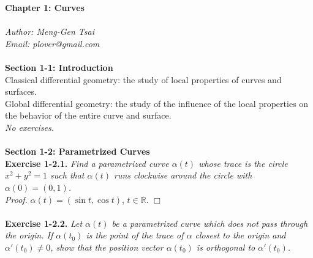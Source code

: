 \documentclass{article}
\begin{document}
\textbf{\Large Chapter 1: Curves} \\\\



\emph{Author: Meng-Gen Tsai} \\
\emph{Email: plover@gmail.com} \\\\









\textbf{\large Section 1-1: Introduction} \\

Classical differential geometry: the study of local properties of
curves and surfaces. \\

Global differential geometry: the study of the influence of the local properties
on the behavior of the entire curve and surface. \\

\emph{No exercises.} \\\\






\textbf{\large Section 1-2: Parametrized Curves} \\

\textbf{Exercise 1-2.1.}
\emph{Find a parametrized curve $\alpha(t)$ whose trace is the circle
$x^2 + y^2 = 1$ such that $\alpha(t)$ runs clockwise around the circle
with $\alpha(0) = (0,1)$.} \\

\emph{Proof.}
$\alpha(t) = (\sin t, \cos t)$, $t \in \mathbb{R}$.
$\Box$ \\\\



\textbf{Exercise 1-2.2.}
\emph{Let $\alpha(t)$ be a parametrized curve which does not pass through the origin.
If $\alpha(t_0)$ is the point of the trace of $\alpha$ closest to the origin
and $\alpha'(t_0) \neq 0$, show that the position vector $\alpha(t_0)$ is
orthogonal to $\alpha'(t_0)$.} \\
\end{document}
